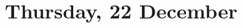 \documentclass[
	openany, %
	parskip=full, %
	12pt, %
	a4paper, %
]{conferencebooklet} %
\begin{document}
\section{Thursday, 22 December}


\end{document}
